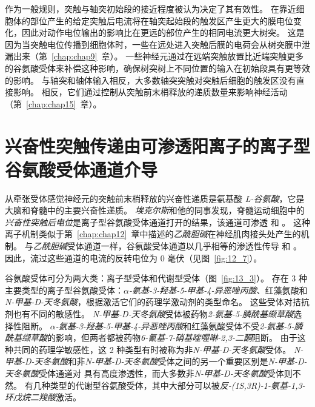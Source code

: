 作为一般规则，突触与轴突初始段的接近程度被认为决定了其有效性。
在靠近细胞体的部位产生的给定突触后电流将在轴突起始段的触发区产生更大的膜电位变化，因此对动作电位输出的影响比在更远的部位产生的相同电流更大树突。
这是因为当突触电位传播到细胞体时，一些在远处进入突触后膜的电荷会从树突膜中泄漏出来（第~\ref{chap:chap9}~章）。
一些神经元通过在远端突触放置比近端突触更多的谷氨酸受体来补偿这种影响，确保树突树上不同位置的输入在初始段具有更等效的影响。
与轴突和轴体输入相反，大多数轴突突触对突触后细胞的触发区没有直接影响。
相反，它们通过控制从突触前末梢释放的递质数量来影响神经活动（第~\ref{chap:chap15}~章）。



\section{兴奋性突触传递由可渗透阳离子的离子型谷氨酸受体通道介导}

从牵张受体感觉神经元的突触前末梢释放的兴奋性递质是氨基酸 \textit{L-谷氨酸}，它是大脑和脊髓中的主要兴奋性递质。
\textit{埃克尔斯}和他的同事发现，脊髓运动细胞中的\textit{兴奋性突触后电位}是离子型谷氨酸受体通道打开的结果，该通道可渗透  和 。
这种离子机制类似于第~\ref{chap:chap12}~章中描述的\textit{乙酰胆碱}在神经肌肉接头处产生的机制。
与\textit{乙酰胆碱}受体通道一样，谷氨酸受体通道以几乎相等的渗透性传导  和 。
因此，流过这些通道的电流的反转电位为 0 毫伏（见图~\ref{fig:12_7}）。


谷氨酸受体可分为两大类：离子型受体和代谢型受体（图~\ref{fig:13_3}）。 
存在 3 种主要类型的离子型谷氨酸受体：\textit{$\alpha$-氨基-3-羟基-5-甲基-4-异恶唑丙酸}、红藻氨酸和\textit{N-甲基-D-天冬氨酸}，根据激活它们的药理学激动剂的类型命名。
这些受体对拮抗剂也有不同的敏感性。
\textit{N-甲基-D-天冬氨酸}受体被药物\textit{2-氨基-5-膦酰基缬草酸}选择性阻断。
\textit{$\alpha$-氨基-3-羟基-5-甲基-4-异恶唑丙酸}和红藻氨酸受体不受\textit{2-氨基-5-膦酰基缬草酸}的影响，但两者都被药物\textit{6-氰基-7-硝基喹喔啉-2,3-二酮}阻断。
由于这种共同的药理学敏感性，这 2 种类型有时被称为非\textit{N-甲基-D-天冬氨酸}受体。
\textit{N-甲基-D-天冬氨酸}和非\textit{N-甲基-D-天冬氨酸}受体之间的另一个重要区别是\textit{N-甲基-D-天冬氨酸}受体通道对  具有高度渗透性，而大多数非\textit{N-甲基-D-天冬氨酸}受体则不然。
有几种类型的代谢型谷氨酸受体，其中大部分可以被\textit{反-(1S,3R)-1-氨基-1,3-环戊烷二羧酸}激活。


